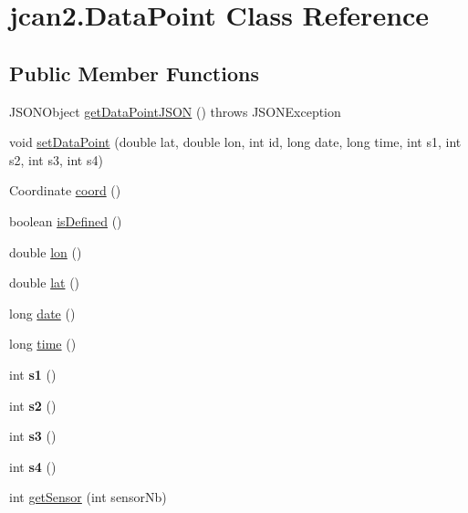 \hypertarget{classjcan2_1_1_data_point}{}\section{jcan2.\+Data\+Point Class Reference}
\label{classjcan2_1_1_data_point}
\subsection*{Public Member Functions}
\begin{DoxyCompactItemize}
\item 
J\+S\+O\+N\+Object \hyperlink{classjcan2_1_1_data_point_a6533f6ff0949652b20df717d0efb88e1}{get\+Data\+Point\+J\+S\+O\+N} ()  throws J\+S\+O\+N\+Exception 
\item 
void \hyperlink{classjcan2_1_1_data_point_ac1d6de759e0647ce0622dcaece77f993}{set\+Data\+Point} (double lat, double lon, int id, long date, long time, int s1, int s2, int s3, int s4)
\item 
Coordinate \hyperlink{classjcan2_1_1_data_point_aaaaddaa75c9f145937a5f4cd1f1ef149}{coord} ()
\item 
boolean \hyperlink{classjcan2_1_1_data_point_a80eaa2ed92598d0bff5a1504566b4925}{is\+Defined} ()
\item 
double \hyperlink{classjcan2_1_1_data_point_a2f13156cea6b5bc87d55f31f14dafda4}{lon} ()
\item 
double \hyperlink{classjcan2_1_1_data_point_a32e094bb9b899fda86e098089d211fbd}{lat} ()
\item 
long \hyperlink{classjcan2_1_1_data_point_a9d43fede68341ec6fcfc5fc34629c1db}{date} ()
\item 
long \hyperlink{classjcan2_1_1_data_point_a079673efabba1c06d85ba6e1d2ac5c97}{time} ()
\item 
\hypertarget{classjcan2_1_1_data_point_a7cb9f163f019a324f90c96bcf1ff89e4}{}int {\bfseries s1} ()\label{classjcan2_1_1_data_point_a7cb9f163f019a324f90c96bcf1ff89e4}

\item 
\hypertarget{classjcan2_1_1_data_point_a51dcd957faf0b7965ba92a3afc0632b0}{}int {\bfseries s2} ()\label{classjcan2_1_1_data_point_a51dcd957faf0b7965ba92a3afc0632b0}

\item 
\hypertarget{classjcan2_1_1_data_point_a927d6578c81f762ee68eefa4b49383d4}{}int {\bfseries s3} ()\label{classjcan2_1_1_data_point_a927d6578c81f762ee68eefa4b49383d4}

\item 
\hypertarget{classjcan2_1_1_data_point_a99965793a290def13947fad58622eedf}{}int {\bfseries s4} ()\label{classjcan2_1_1_data_point_a99965793a290def13947fad58622eedf}

\item 
int \hyperlink{classjcan2_1_1_data_point_aafce513bf728afc72c7c6e14066cab77}{get\+Sensor} (int sensor\+Nb)
\end{DoxyCompactItemize}


